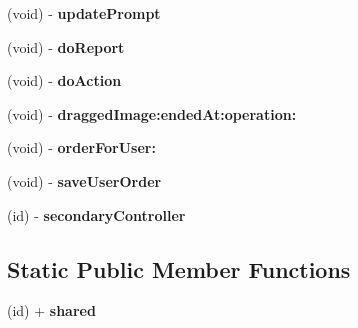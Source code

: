 \begin{DoxyCompactItemize}
\item 
\hypertarget{interface_d_a_c_a_l_tree_data_source_ae7840da83ed32c9eb174bffaaba05d4c}{
(void) -\/ {\bfseries updatePrompt}}
\label{interface_d_a_c_a_l_tree_data_source_ae7840da83ed32c9eb174bffaaba05d4c}

\item 
\hypertarget{interface_d_a_c_a_l_tree_data_source_ac3f962df9ed7f0b7509db5365629762c}{
(void) -\/ {\bfseries doReport}}
\label{interface_d_a_c_a_l_tree_data_source_ac3f962df9ed7f0b7509db5365629762c}

\item 
\hypertarget{interface_d_a_c_a_l_tree_data_source_a45e46aff1389898563d86c62f4e5d30c}{
(void) -\/ {\bfseries doAction}}
\label{interface_d_a_c_a_l_tree_data_source_a45e46aff1389898563d86c62f4e5d30c}

\item 
\hypertarget{interface_d_a_c_a_l_tree_data_source_a612c048cd878bafbc80ede2e3c14193d}{
(void) -\/ {\bfseries draggedImage:endedAt:operation:}}
\label{interface_d_a_c_a_l_tree_data_source_a612c048cd878bafbc80ede2e3c14193d}

\item 
\hypertarget{interface_d_a_c_a_l_tree_data_source_a219d2e10a5c042b905ffc19d6087cd39}{
(void) -\/ {\bfseries orderForUser:}}
\label{interface_d_a_c_a_l_tree_data_source_a219d2e10a5c042b905ffc19d6087cd39}

\item 
\hypertarget{interface_d_a_c_a_l_tree_data_source_a28d8082da836257a0781ee38e15f5d7b}{
(void) -\/ {\bfseries saveUserOrder}}
\label{interface_d_a_c_a_l_tree_data_source_a28d8082da836257a0781ee38e15f5d7b}

\item 
\hypertarget{interface_d_a_c_a_l_tree_data_source_a5d9ac53741773b96df601fe1f165941d}{
(id) -\/ {\bfseries secondaryController}}
\label{interface_d_a_c_a_l_tree_data_source_a5d9ac53741773b96df601fe1f165941d}

\end{DoxyCompactItemize}
\subsection*{Static Public Member Functions}
\begin{DoxyCompactItemize}
\item 
\hypertarget{interface_d_a_c_a_l_tree_data_source_a0fd74b9b6eff9836f64c5b90e440ac13}{
(id) + {\bfseries shared}}
\label{interface_d_a_c_a_l_tree_data_source_a0fd74b9b6eff9836f64c5b90e440ac13}

\end{DoxyCompactItemize}
